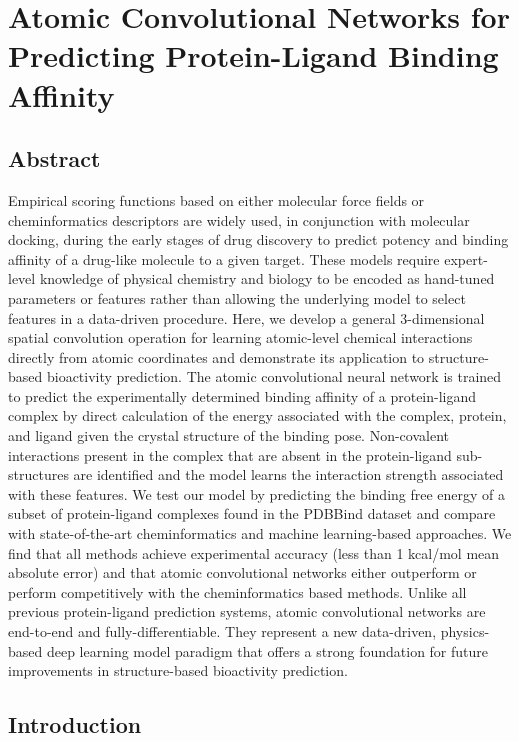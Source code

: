 \section{Atomic Convolutional Networks for Predicting Protein-Ligand Binding Affinity}

\subsection{Abstract}
Empirical scoring functions based on either molecular force fields or cheminformatics descriptors are widely used, in conjunction with molecular docking, during the early stages of drug discovery to predict potency and binding affinity of a drug-like molecule to a given target.  These models require expert-level knowledge of physical chemistry and biology to be encoded as hand-tuned parameters or features rather than allowing the underlying model to select features in a data-driven procedure.  Here, we develop a general 3-dimensional spatial convolution operation for learning atomic-level chemical interactions directly from atomic coordinates and demonstrate its application to structure-based bioactivity prediction.  The atomic convolutional neural network is trained to predict the experimentally determined binding affinity of a protein-ligand complex by direct calculation of the energy associated with the complex, protein, and ligand given the crystal structure of the binding pose. Non-covalent interactions present in the complex that are absent in the protein-ligand sub-structures are identified and the model learns the interaction strength associated with these features. We test our model by predicting the binding free energy of a subset of protein-ligand complexes found in the PDBBind dataset and compare with state-of-the-art cheminformatics and machine learning-based approaches.  We find that all methods achieve experimental accuracy (less than 1 kcal/mol mean absolute error) and that atomic convolutional networks either outperform or perform competitively with the cheminformatics based methods. Unlike all previous protein-ligand prediction systems, atomic convolutional networks are end-to-end and fully-differentiable.  They represent a new data-driven, physics-based deep learning model paradigm that offers a strong foundation for future improvements in structure-based bioactivity prediction. 

\subsection{Introduction}


